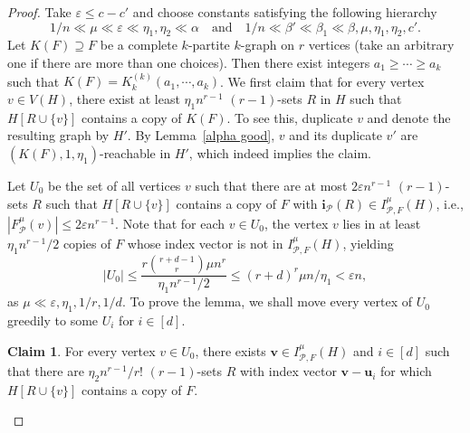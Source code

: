 \documentclass[11pt, letterpaper]{amsart}
\theoremstyle{plain}
\numberwithin{equation}{section}
\theoremstyle{definition}
\newtheorem{claim}[thm]{Claim}
\newcommand\card[1]{\left| #1 \right|}
\renewcommand{\vec}[1]{{\mathbf #1}}
\begin{document}
\begin{proof}
Take $\varepsilon\le c-c'$ and choose constants satisfying the following hierarchy 
\[
1/n\ll\mu\ll\varepsilon\ll\eta_1,\eta_2\ll\alpha\quad \text{and} \quad  1/n\ll \beta'\ll\beta_1\ll\beta,\mu,\eta_1,\eta_2,c'.
\]      
Let $K(F)\supseteq F$ be a complete $k$-partite $k$-graph on $r$ vertices (take an arbitrary one if there are more than one choices). 
Then there exist integers  $a_1\ge\cdots\ge a_k$ such that $K(F)=K_k^{(k)}(a_1,\cdots,a_k)$. 
We first claim that for every vertex \(v\in V(H)\), there exist at least $\eta_1 n^{r-1}$ $(r-1)$-sets $R$ in $H$ such that $H[R\cup \{v\}]$ contains a copy of $K(F)$. 
To see this, duplicate $v$ and denote the resulting graph by $H'$. 
By Lemma~\ref{alpha good}, $v$ and its duplicate $v'$ are $(K(F),1,\eta_1)$-reachable in \(H'\), which indeed implies the claim. 
 
Let $ U_0 $ be the set of all vertices $v$ such that there are at most $2\varepsilon n^{r-1}$ \((r-1)\)-sets \(R\) such that \(H[R\cup\{v\}]\) contains a copy of \(F\) with $\vec{i}_{\mathcal{P}}(R)\in I_{\mathcal{P},F}^{\mu}(H)$, i.e., \(\card{F_{\mathcal{P}}^{\mu}(v)}\le 2\varepsilon n^{r-1}\).
Note that for each \(v\in U_0\), the vertex \(v\) lies in at least \(\eta_1 n^{r-1}/2\) copies of \(F\) whose index vector is not in \(I_{\mathcal{P},F}^{\mu}(H)\), yielding
\[
|U_0|\le\frac{r\binom{r+d-1}{r}\mu n^r}{\eta_1n^{r-1}/2}\le (r+d)^{r}\mu n/\eta_1 <\varepsilon n,
\]
as $\mu\ll\varepsilon,\eta_1, 1/r,1/d$. 
To prove the lemma, we shall move every vertex of $ U_0 $ greedily to some $ U_i $ for $ i\in[d] $. 

\begin{claim}
\label{clm:vvi}
For every vertex $v\in U_0$, there exists $\vec{v}\in I_{\mathcal P, F}^{\mu}(H)$ and $i\in [d]$ such that there are $\eta_2 n^{r-1}/r!$ \((r-1)\)-sets \(R\) with index vector $\vec{v}-\vec{u}_i$ for which \(H[R\cup \{v\}]\) contains a copy of \(F\).
\end{claim}


\end{proof}
\end{document}

